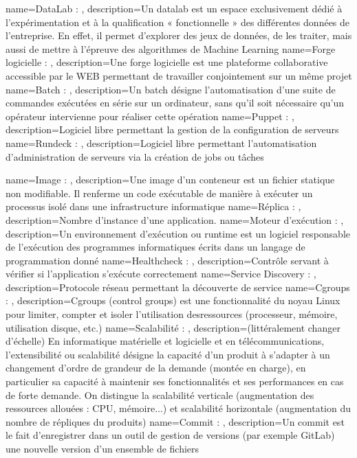 {
    name=DataLab : ,
    description={Un datalab est un espace exclusivement dédié à l’expérimentation et à la qualification « fonctionnelle » des différentes données de l’entreprise. En effet, il permet d’explorer des jeux de données, de les traiter, mais aussi de mettre à l’épreuve des algorithmes de Machine Learning}
}
{
    name=Forge logicielle : ,
    description={Une forge logicielle est une plateforme collaborative accessible par le WEB permettant de travailler conjointement sur un même projet}
}
{
    name=Batch : ,
    description={Un batch désigne l’automatisation d’une suite de commandes exécutées en série sur un ordinateur, sans qu’il soit nécessaire qu’un opérateur intervienne pour réaliser cette opération}
}
{
    name=Puppet : ,
    description={Logiciel libre permettant la gestion de la configuration de serveurs}
}
{
    name=Rundeck : ,
    description={Logiciel libre permettant l’automatisation d’administration de serveurs via la création de jobs ou tâches}
}

{
    name=Image : ,
    description={Une image d'un conteneur est un fichier statique non modifiable. Il renferme un code exécutable de manière à exécuter un processus isolé dans une infrastructure informatique}
}
{
    name=Réplica : ,
    description={Nombre d’instance d’une application.}
}
{
    name=Moteur d'exécution : ,
    description={Un environnement d’exécution ou runtime est un logiciel responsable de l’exécution des programmes informatiques écrits dans un langage de programmation donné}
}
{
    name=Healthcheck : ,
    description={Contrôle servant à vérifier si l’application s’exécute correctement}
}
{
    name=Service Discovery : ,
    description={Protocole réseau permettant la découverte de service}
}
{
    name=Cgroups : ,
    description={Cgroups (control groups) est une fonctionnalité du noyau Linux pour limiter, compter et isoler l’utilisation desressources (processeur, mémoire, utilisation disque, etc.)}
}
{
    name=Scalabilité : ,
    description={(littéralement changer d'échelle) En informatique matérielle et logicielle et en télécommunications, l’extensibilité ou scalabilité désigne la capacité d'un produit à s'adapter à un changement d'ordre de grandeur de la demande (montée en charge), en particulier sa capacité à maintenir ses fonctionnalités et ses performances en cas de forte demande. On distingue la scalabilité verticale (augmentation des ressources allouées :  CPU, mémoire...) et scalabilité horizontale (augmentation du nombre de répliques du produits)}
}
{
    name=Commit : ,
    description={Un commit est le fait d’enregistrer dans un outil de gestion de versions (par exemple GitLab) une nouvelle version d’un ensemble de fichiers}
}

